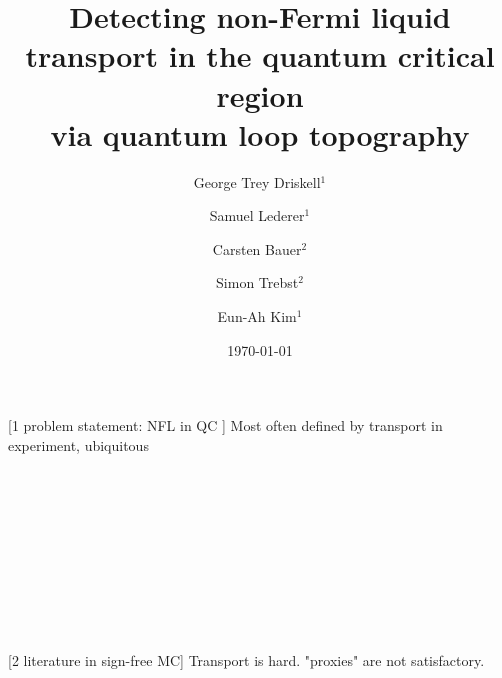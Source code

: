 \documentclass[amsmath,amssymb, aps, prx, longbibliography, twocolumn]{revtex4-1}
\begin{document}
\title{ Detecting non-Fermi liquid transport in the quantum critical region \\ via quantum loop topography}

\author{George Trey Driskell$^1$}
\author{Samuel Lederer$^1$}
\author{Carsten Bauer$^2$}
\author{Simon Trebst$^2$}
\author{Eun-Ah Kim$^1$}

%

\date{\today}

\begin{abstract}

\end{abstract}

\maketitle

[1 problem statement: NFL in QC ]
Most often defined by transport in experiment, ubiquitous
\\
\\
\\
\\
\\
\\
\\
\\
\\
\\
\\


[2 literature in sign-free MC]
Transport is hard. "proxies" are not satisfactory.
\\
\\
\\
\\
\\
\\
\\
\\
\\
\\
\\
\\
\\
\\
\\
\end{document}
